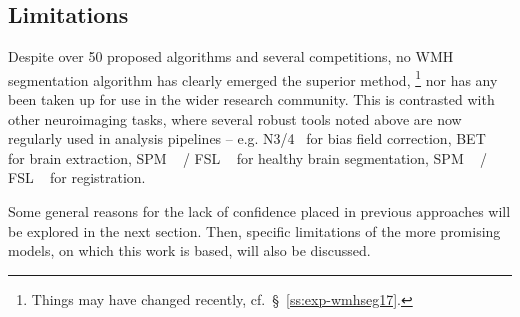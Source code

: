 \subsection{Limitations}\label{ss:priorlimits}
Despite over 50 proposed algorithms and several competitions,
no WMH segmentation algorithm has clearly emerged the superior method,%
\footnote{Things may have changed recently, cf.~\S~\ref{ss:exp-wmhseg17}.}
nor has any been taken up for use in the wider research community.
This is contrasted with other neuroimaging tasks,
where several robust tools noted above are now regularly used in analysis pipelines -- e.g.
N3/4~\cite{Tustison2010} for bias field correction,
BET~\cite{Smith2002a}
for brain extraction,
SPM ~\cite{Ashburner2005} / FSL ~\cite{Zhang2001}
for healthy brain segmentation,
SPM ~\cite{Ashburner2005} / FSL ~\cite{Andersson2007}
for registration.
\par
Some general reasons for
the lack of confidence placed in previous approaches will be explored in the next section.
Then, specific limitations of the more promising models, on which this work is based,
will also be discussed.
